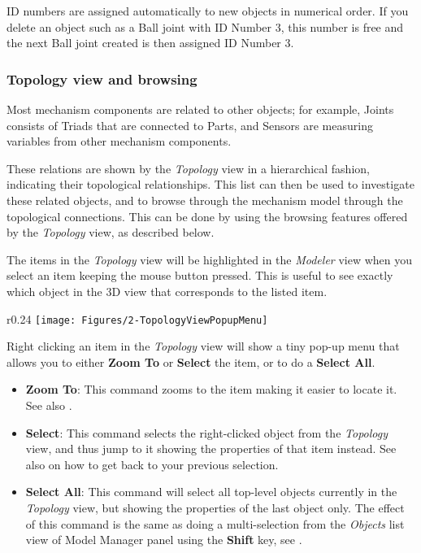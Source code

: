 
ID numbers are assigned automatically to new objects in numerical order.
If you delete an object such as a Ball joint with ID Number 3, this number
is free and the next Ball joint created is then assigned ID Number 3.

\subsubsection{Topology view and browsing}

Most mechanism components are related to other objects; for example, Joints
consists of Triads that are connected to Parts, and Sensors are measuring
variables from other mechanism components.

These relations are shown by the {\sl Topology} view in a hierarchical fashion,
indicating their topological relationships.
This list can then be used to investigate these related objects,
and to browse through the mechanism model through the topological connections.
This can be done by using the browsing features offered by the
{\sl Topology} view, as described below.

The items in the {\sl Topology} view will be highlighted in the {\sl Modeler}
view when you select an item keeping the mouse button pressed.
This is useful to see exactly which object in the 3D view that corresponds
to the listed item.

\begin{wrapfigure}[4]{r}{0.24\textwidth} \vskip-5mm
  \texttt{[image: Figures/2-TopologyViewPopupMenu]}
\end{wrapfigure}

Right clicking an item in the {\sl Topology} view will \newline show a tiny pop-up
menu that allows you to either \textbf{Zoom To} or \textbf{Select} the
item, or to do a \textbf{Select All}.

\begin{itemize}
\item\textbf{Zoom To}:
  This command zooms to the item making it easier to locate it.
  See also .
\end{itemize}

\begin{itemize}
\item\textbf{Select}:
  This command selects the right-clicked object from the {\sl Topology} view,
  and thus jump to it showing the properties of that item instead. See also
   on how to get back to your previous selection.
\item\textbf{Select All}:
  This command will select all top-level objects currently in the
  {\sl Topology} view, but showing the properties of the last object only.
  The effect of this command is the same as doing a multi-selection from the
  {\sl Objects} list view of Model Manager panel using the \textbf{Shift} key,
  see .
\end{itemize}

